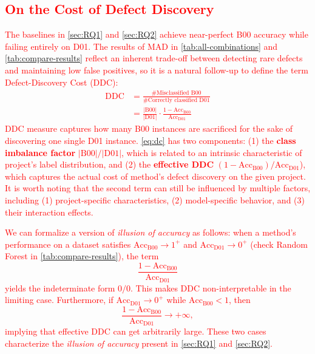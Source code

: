 \documentclass[authoryear,final,5p,times,twocolumn]{elsarticle}
\theoremstyle{plain}
\begin{document}
\subsection{\textcolor{red}{On the Cost of Defect Discovery}}
\label{sec:ddc}
\textcolor{red}{
The baselines in \autoref{sec:RQ1} and \autoref{sec:RQ2} achieve near-perfect B00 accuracy while failing entirely on D01. The results of MAD in \autoref{tab:all-combinations} and \autoref{tab:compare-results} reflect an inherent trade-off between detecting rare defects and maintaining low false positives, so it is a natural follow-up to define the term Defect-Discovery Cost (DDC):}
\textcolor{red}{
\begin{align}
\text{DDC}
&= \frac{\#\text{Misclassified B00}}{\#\text{Correctly classified D01}} \nonumber \\
&= \frac{|\mathrm{B00}|}{|\mathrm{D01}|} \cdot
   \frac{1 - \mathrm{Acc}_{\mathrm{B00}}}{\mathrm{Acc}_{\mathrm{D01}}}
\label{eq:dc}
\end{align}}
\textcolor{red}{
DDC measure captures how many B00 instances are sacrificed for the sake of discovering one single D01 instance. \autoref{eq:dc} has two components: (1) the \textbf{class imbalance factor} $|\mathrm{B00}| / |\mathrm{D01}|$, which is related to an intrinsic characteristic of project's label distribution, and (2) the \textbf{effective DDC} $(1- \mathrm{Acc}_{\mathrm{B00}}) / \mathrm{Acc}_{\mathrm{D01}}$), which captures the actual cost of method’s defect discovery on the given project. It is worth noting that the second term can still be influenced by multiple factors, including (1) project-specific characteristics, (2) model-specific behavior, and (3) their interaction effects.}

\textcolor{red}{
We can formalize a version of \emph{illusion of accuracy} as follows: when a method’s performance on a dataset satisfies $\mathrm{Acc}_{\mathrm{B00}} \to 1^{+}$ and $\mathrm{Acc}_{\mathrm{D01}} \to 0^{+}$ (check Random Forest in \autoref{tab:compare-results}), the term
\[
\frac{1 - \mathrm{Acc}_{\mathrm{B00}}}{\mathrm{Acc}_{\mathrm{D01}}}
\]
yields the indeterminate form $0/0$. This makes DDC non-interpretable in the limiting case. Furthermore, if $\mathrm{Acc}_{\mathrm{D01}} \to 0^{+}$ while $\mathrm{Acc}_{\mathrm{B00}} < 1$, then
\[
\frac{1 - \mathrm{Acc}_{\mathrm{B00}}}{\mathrm{Acc}_{\mathrm{D01}}} \to +\infty,
\]
implying that effective DDC can get arbitrarily large. These two cases characterize the \emph{illusion of accuracy} present in \autoref{sec:RQ1} and \autoref{sec:RQ2}.}
\end{document}

